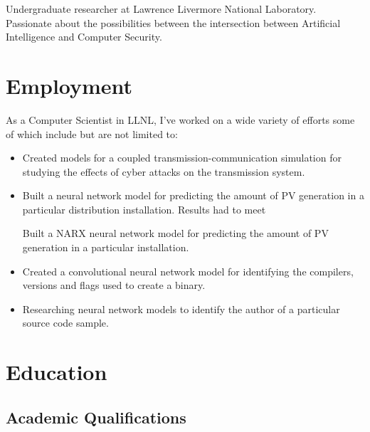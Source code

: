 \documentclass[12pt,a4paper,roman]{moderncv}        %
\begin{document}
\makecvtitle

\small{Undergraduate researcher at Lawrence Livermore National Laboratory. Passionate about the possibilities between the intersection between Artificial Intelligence and Computer Security.}

\section{Employment}

\vspace{5pt}

As a Computer Scientist in LLNL, I've worked on a wide variety of efforts some of which include but are not limited to:
\begin{itemize}
	\item Created models for a coupled transmission-communication simulation for studying the effects of cyber attacks on the transmission system. 
	
	\item Built a neural network model for predicting the amount of PV generation in a particular distribution installation. Results had to meet 
	
	Built a NARX neural network model for predicting the amount of PV generation in a particular installation.
	
	\item Created a convolutional neural network model for identifying the compilers, versions and flags used to create a binary.  

	\item Researching neural network models to identify the author of a particular source code sample. 
\end{itemize}

\section{Education}

\subsection{Academic Qualifications}
\end{document}
